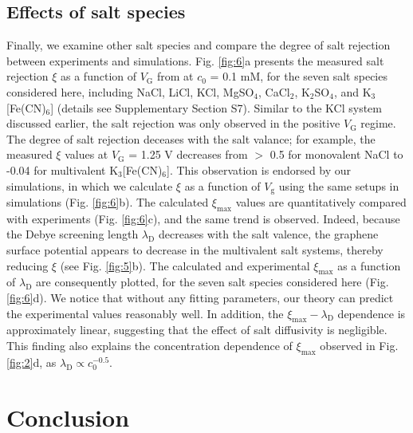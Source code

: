 \documentclass[journal=langd5,email=true, hyperref=true, keywords=false]{achemso}
\newcommand{\Fig}{Fig.}
\begin{document}
\subsection{Effects of salt species}
\label{sec:salts}

Finally, we examine other salt species and compare the degree of salt
rejection between experiments and simulations. \Fig{} \ref{fig:6}a
presents the measured salt rejection $\xi$ as a function of
$V_{\mathrm{G}}$ from at $c_{0}$ = 0.1 mM, for the seven salt species
considered here, including NaCl, LiCl, KCl, MgSO$_{4}$, CaCl$_{2}$,
K$_{2}$SO$_{4}$, and K$_{3}$[Fe(CN)$_{6}$] (details see Supplementary
Section S7). Similar to the KCl system discussed earlier, the salt
rejection was only observed in the positive $V_{\mathrm{G}}$
regime. The degree of salt rejection deceases with the salt valance;
for example, the measured $\xi$ values at $V_{\mathrm{G}}$ = 1.25 V
decreases from $>$ 0.5 for monovalent NaCl to -0.04 for multivalent
K$_{3}$[Fe(CN)$_{6}$]. This observation is endorsed by our simulations,
in which we calculate $\xi$ as a function of $V_{\mathrm{g}}$ using
the same setups in simulations (\Fig{} \ref{fig:6}b). The calculated
$\xi_{\mathrm{max}}$ values are quantitatively compared with
experiments (\Fig{} \ref{fig:6}c), and the same trend is
observed. Indeed, because the Debye screening length
$\lambda_{\mathrm{D}}$ decreases with the salt valence, the graphene
surface potential appears to decrease in the multivalent salt systems,
thereby reducing $\xi$ (see \Fig{} \ref{fig:5}b). The calculated and
experimental $\xi_{\mathrm{max}}$ as a function of
$\lambda_{\mathrm{D}}$ are consequently plotted, for the seven salt
species considered here (\Fig{} \ref{fig:6}d). We notice that without
any fitting parameters, our theory can predict the experimental values
reasonably well. In addition, the
$\xi_{\mathrm{max}}-\lambda_{\mathrm{D}}$ dependence is approximately
linear, suggesting that the effect of salt diffusivity is
negligible. This finding also explains the concentration dependence of
$\xi_{\mathrm{max}}$ observed in \Fig{} \ref{fig:2}d, as
$\lambda_{\mathrm{D}} \propto c_{0}^{-0.5}$.

\section{Conclusion}
\label{sec:consl}
\end{document}
